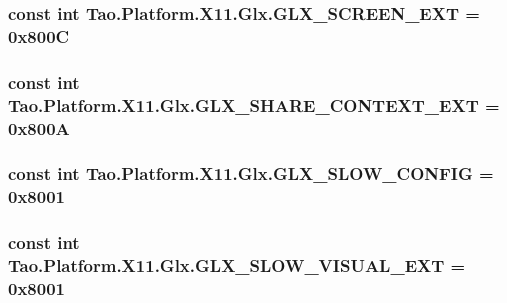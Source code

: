 \label{class_tao_1_1_platform_1_1_x11_1_1_glx_a0b9ae4d32b7263fa6c4a8c8fa35030c9}
\hypertarget{class_tao_1_1_platform_1_1_x11_1_1_glx_a7f97f97f95eddfb79e1ae39032c98a7f}{
\subsubsection[{GLX\_\-SCREEN\_\-EXT}]{\setlength{\rightskip}{0pt plus 5cm}const int {\bf Tao.Platform.X11.Glx.GLX\_\-SCREEN\_\-EXT} = 0x800C}}
\label{class_tao_1_1_platform_1_1_x11_1_1_glx_a7f97f97f95eddfb79e1ae39032c98a7f}
\hypertarget{class_tao_1_1_platform_1_1_x11_1_1_glx_a1d7d422f83455ebe81d6d69f850d5033}{
\subsubsection[{GLX\_\-SHARE\_\-CONTEXT\_\-EXT}]{\setlength{\rightskip}{0pt plus 5cm}const int {\bf Tao.Platform.X11.Glx.GLX\_\-SHARE\_\-CONTEXT\_\-EXT} = 0x800A}}
\label{class_tao_1_1_platform_1_1_x11_1_1_glx_a1d7d422f83455ebe81d6d69f850d5033}
\hypertarget{class_tao_1_1_platform_1_1_x11_1_1_glx_ae00dd5da604664ab67feebfd716fae89}{
\subsubsection[{GLX\_\-SLOW\_\-CONFIG}]{\setlength{\rightskip}{0pt plus 5cm}const int {\bf Tao.Platform.X11.Glx.GLX\_\-SLOW\_\-CONFIG} = 0x8001}}
\label{class_tao_1_1_platform_1_1_x11_1_1_glx_ae00dd5da604664ab67feebfd716fae89}
\hypertarget{class_tao_1_1_platform_1_1_x11_1_1_glx_a6ace1cdea8ca8d0277262bbbdab3208e}{
\subsubsection[{GLX\_\-SLOW\_\-VISUAL\_\-EXT}]{\setlength{\rightskip}{0pt plus 5cm}const int {\bf Tao.Platform.X11.Glx.GLX\_\-SLOW\_\-VISUAL\_\-EXT} = 0x8001}}
